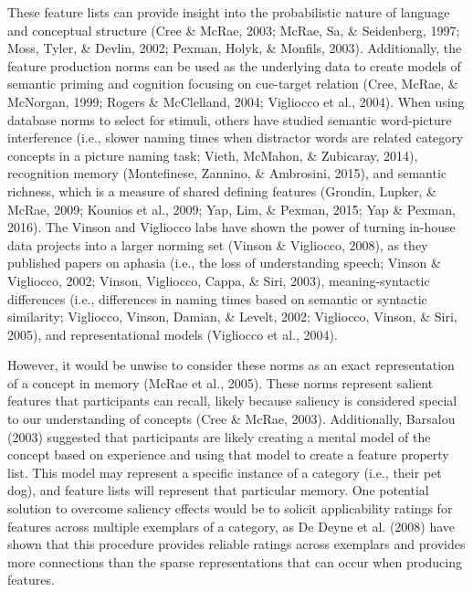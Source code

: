 \documentclass[english,,man]{apa6}
\begin{document}
These feature lists can provide insight into the probabilistic nature of language and conceptual structure (Cree \& McRae, 2003; McRae, Sa, \& Seidenberg, 1997; Moss, Tyler, \& Devlin, 2002; Pexman, Holyk, \& Monfils, 2003). Additionally, the feature production norms can be used as the underlying data to create models of semantic priming and cognition focusing on cue-target relation (Cree, McRae, \& McNorgan, 1999; Rogers \& McClelland, 2004; Vigliocco et al., 2004). When using database norms to select for stimuli, others have studied semantic word-picture interference (i.e., slower naming times when distractor words are related category concepts in a picture naming task; Vieth, McMahon, \& Zubicaray, 2014), recognition memory (Montefinese, Zannino, \& Ambrosini, 2015), and semantic richness, which is a measure of shared defining features (Grondin, Lupker, \& McRae, 2009; Kounios et al., 2009; Yap, Lim, \& Pexman, 2015; Yap \& Pexman, 2016). The Vinson and Vigliocco labs have shown the power of turning in-house data projects into a larger norming set (Vinson \& Vigliocco, 2008), as they published papers on aphasia (i.e., the loss of understanding speech; Vinson \& Vigliocco, 2002; Vinson, Vigliocco, Cappa, \& Siri, 2003), meaning-syntactic differences (i.e., differences in naming times based on semantic or syntactic similarity; Vigliocco, Vinson, Damian, \& Levelt, 2002; Vigliocco, Vinson, \& Siri, 2005), and representational models (Vigliocco et al., 2004).

However, it would be unwise to consider these norms as an exact representation of a concept in memory (McRae et al., 2005). These norms represent salient features that participants can recall, likely because saliency is considered special to our understanding of concepts (Cree \& McRae, 2003). Additionally, Barsalou (2003) suggested that participants are likely creating a mental model of the concept based on experience and using that model to create a feature property list. This model may represent a specific instance of a category (i.e., their pet dog), and feature lists will represent that particular memory. One potential solution to overcome saliency effects would be to solicit applicability ratings for features across multiple exemplars of a category, as De Deyne et al. (2008) have shown that this procedure provides reliable ratings across exemplars and provides more connections than the sparse representations that can occur when producing features.
\end{document}
